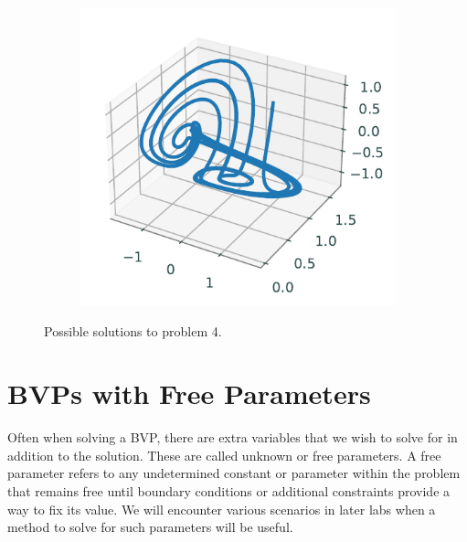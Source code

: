 \begin{figure}[H]
\begin{subfigure}[b]{.3\textwidth}
    \end{subfigure}
    \begin{subfigure}[b]{.3\textwidth}
        \centering
        \includegraphics[width = \textwidth ]{figures/problem43.pdf}
    \end{subfigure}
    \caption{Possible solutions to problem 4.}
    \label{fig:bvpintro:bvp4}
\end{figure}


\section*{BVPs with Free Parameters}

Often when solving a BVP, there are extra variables that we wish to solve for in addition to the solution.
These are called unknown or free parameters.
A free parameter refers to any undetermined constant or parameter within the problem that remains free until boundary conditions or additional constraints provide a way to fix its value.
We will encounter various scenarios in later labs when a method to solve for such parameters will be useful.

